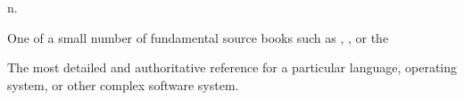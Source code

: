  n.

\begin{inparaenum}
    \item One of a small number of fundamental source books such as
        , , or the 
    \item The most detailed and authoritative reference for a particular
        language, operating system, or other complex software system.
\end{inparaenum}

